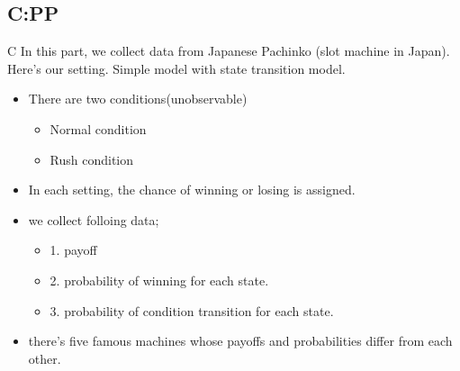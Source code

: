 \documentclass{beamer}
\begin{document}
\subsection{C:PP}

\begin{frame}{C}
In this part, we collect data from Japanese Pachinko (slot machine in Japan).\\
Here's our setting. Simple model with state transition model.
\begin{itemize}
    \item There are two conditions(unobservable)
    \begin{itemize}
        \item Normal condition
        \item Rush condition
    \end{itemize}
    \item In each setting, the chance of winning or losing is assigned.
\end{itemize}
\begin{itemize}
    \item we collect folloing data; 
    \begin{itemize}
        \item 1. payoff
        \item 2. probability of winning for each state.
        \item 3. probability of condition transition for each state.
    \end{itemize}
    \item there's five famous machines whose payoffs and probabilities differ from each other.
\end{itemize}
\end{frame}
\end{document}
